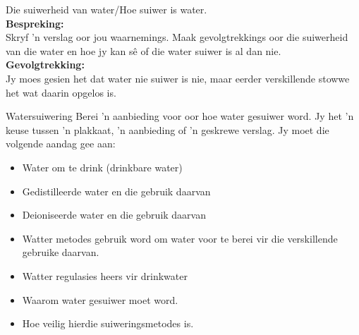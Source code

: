 \begin{g_experiment}{Die suiwerheid van water/Hoe suiwer is water.}
\\
\label{m38138*id3429827}\noindent{}\textbf{Bespreking:}\\
Skryf  'n verslag oor jou waarnemings. Maak gevolgtrekkings oor die suiwerheid van die water en hoe jy kan sê of die water suiwer is al dan nie.
\\  
\label{m38138*id68921}\noindent{}\textbf{Gevolgtrekking:}\\
Jy moes gesien het dat water nie suiwer is nie, maar eerder verskillende stowwe het wat daarin opgelos is.
\\
\end{g_experiment}
\label{m38138*id672214}
            \begin{project}{Watersuiwering}
            \nopagebreak
\label{m38138*id97324}
Berei  'n aanbieding voor oor hoe water gesuiwer word. Jy het  'n keuse tussen  'n plakkaat,  'n aanbieding of  'n geskrewe verslag. Jy moet die volgende aandag gee aan:
\label{m38138*id097324}\begin{itemize}[noitemsep]
            \item Water om te drink (drinkbare water)
\item Gedistilleerde water en die gebruik daarvan
\item Deioniseerde water en die gebruik daarvan
\item Watter metodes gebruik word om water voor te berei vir die verskillende gebruike daarvan.
\item Watter regulasies heers vir drinkwater
\item Waarom water gesuiwer moet word.
\item Hoe veilig hierdie suiweringsmetodes is.
\end{itemize}
\par 
\end{project}


            \nopagebreak


